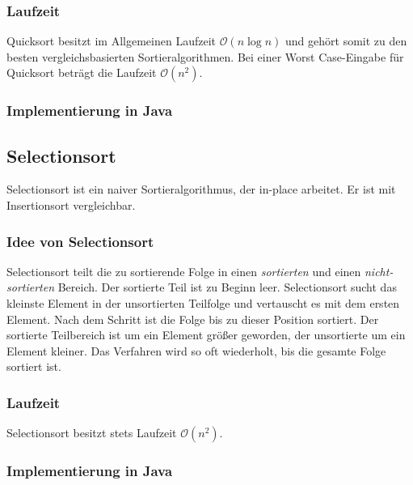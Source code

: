 \documentclass[german]{pfBook}
\newcommand{\OO}{\mathcal{O}}
\begin{document}
	\subsubsection{Laufzeit}
	
	Quicksort besitzt im Allgemeinen Laufzeit $\OO(n \log n)$ und gehört somit zu den besten vergleichsbasierten Sortieralgorithmen. Bei einer Worst Case-Eingabe für Quicksort beträgt die Laufzeit $\OO(n^2)$.
	
	\subsubsection{Implementierung in Java}
	
	
	
	\subsection{Selectionsort}
	
	Selectionsort ist ein naiver Sortieralgorithmus, der in-place arbeitet. Er ist mit Insertionsort vergleichbar.
	
	\subsubsection{Idee von Selectionsort}
	
	Selectionsort teilt die zu sortierende Folge in einen \emph{sortierten} und einen \emph{nicht-sor\-{}tier\-{}ten} Bereich. Der sortierte Teil ist zu Beginn leer. Selectionsort sucht das kleinste Element in der unsortierten Teilfolge und vertauscht es mit dem ersten Element. Nach dem Schritt ist die Folge bis zu dieser Position sortiert. Der sortierte Teilbereich ist um ein Element größer geworden, der unsortierte um ein Element kleiner. Das Verfahren wird so oft wiederholt, bis die gesamte Folge sortiert ist.
	
	\subsubsection{Laufzeit}
	
	Selectionsort besitzt stets Laufzeit $\OO(n^2)$.
	
	\subsubsection{Implementierung in Java}
	
\end{document}
